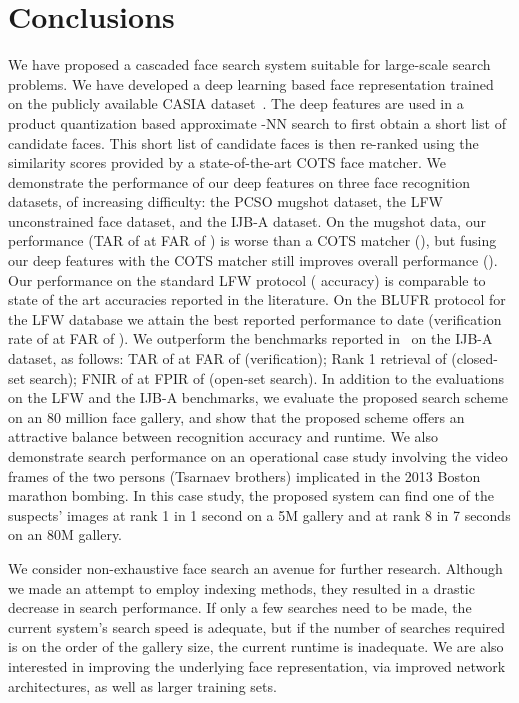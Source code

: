 \documentclass[10pt,journal,compsoc]{IEEEtran}
\begin{document}
\section{Conclusions}
We have proposed a cascaded face search system suitable for large-scale search problems. We have developed a deep learning based face representation trained on the publicly available CASIA dataset~\cite{DB:CASIA}. The deep features are used in a product quantization based approximate -NN search to first obtain a short list of candidate faces. This short list of candidate faces is then re-ranked using the similarity scores provided by a state-of-the-art COTS face matcher. We demonstrate the performance of our deep features on three face recognition datasets, of increasing difficulty: the PCSO mugshot dataset, the LFW unconstrained face dataset, and the IJB-A dataset. On the mugshot data, our performance (TAR of  at FAR of ) is worse than a COTS matcher (), but fusing our deep features with the COTS matcher still improves overall performance (). Our performance on the standard LFW protocol ( accuracy) is comparable to state of the art accuracies reported in the literature. On the BLUFR protocol for the LFW database we attain the best reported performance to date (verification rate of  at FAR of ). We outperform the benchmarks reported in~\cite{db:janus} on the IJB-A dataset, as follows: TAR of  at FAR of  (verification); Rank 1 retrieval of  (closed-set search); FNIR of  at FPIR of  (open-set search). In addition to the evaluations on the LFW and the IJB-A benchmarks, we evaluate the proposed search scheme on an 80 million face gallery, and show that the proposed scheme offers an attractive balance between recognition accuracy and runtime. We also demonstrate search performance on an operational case study involving the video frames of the two persons (Tsarnaev brothers) implicated in the 2013 Boston marathon bombing. In this case study, the proposed system can find one of the suspects' images at rank 1 in 1 second on a 5M gallery and at rank 8 in 7 seconds on an 80M gallery.

We consider non-exhaustive face search an avenue for further research. Although we made an attempt to employ indexing methods, they resulted in a drastic decrease in search performance. If only a few searches need to be made, the current system's search speed is adequate, but if the number of searches required is on the order of the gallery size, the current runtime is inadequate. We are also interested in improving the underlying face representation, via improved network architectures, as well as larger training sets.
\end{document}
